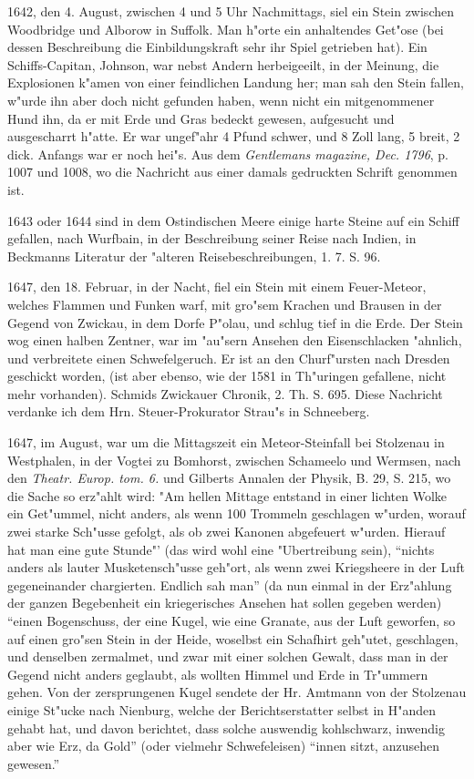\documentclass[a4paper, 11pt, oneside, polutonikogreek, german]{article}
\begin{document}
1642, den 4. August, zwischen 4 und 5 Uhr Nachmittags, siel ein Stein zwischen Woodbridge und Alborow in Suffolk. Man h"orte ein anhaltendes Get"ose (bei dessen Beschreibung die Einbildungskraft sehr ihr Spiel getrieben hat). Ein Schiffs-Capitan, Johnson, war nebst Andern herbeigeeilt, in der Meinung, die Explosionen k"amen von einer feindlichen Landung her; man sah den Stein fallen, w"urde ihn aber doch nicht gefunden haben, wenn nicht ein mitgenommener Hund ihn, da er mit Erde und Gras bedeckt gewesen, aufgesucht und ausgescharrt h"atte. Er war ungef"ahr 4 Pfund schwer, und 8 Zoll lang, 5 breit, 2 dick. Anfangs war er noch hei"s. Aus dem \emph{Gentlemans magazine, Dec. 1796}, p. 1007 und 1008, wo die Nachricht aus einer damals gedruckten Schrift genommen ist.

1643 oder 1644 sind in dem Ostindischen Meere einige harte Steine auf ein Schiff gefallen, nach Wurfbain, in der Beschreibung seiner Reise nach Indien, in Beckmanns Literatur der "alteren Reisebeschreibungen, 1. 7. S. 96.

1647, den 18. Februar, in der Nacht, fiel ein Stein mit einem Feuer-Meteor, welches Flammen und Funken warf, mit gro"sem Krachen und Brausen in der Gegend von Zwickau, in dem Dorfe P"olau, und schlug tief in die Erde. Der Stein wog einen halben Zentner, war im "au"sern Ansehen den Eisenschlacken "ahnlich, und verbreitete einen Schwefelgeruch. Er ist an den Churf"ursten nach Dresden geschickt worden, (ist aber ebenso, wie der 1581 in Th"uringen gefallene, nicht mehr vorhanden). Schmids Zwickauer Chronik, 2. Th. S. 695. Diese Nachricht verdanke ich dem Hrn. Steuer-Prokurator Strau"s in Schneeberg.

1647, im August, war um die Mittagszeit ein Meteor-Steinfall bei Stolzenau in Westphalen, in der Vogtei zu Bomhorst, zwischen Schameelo und Wermsen, nach den \emph{Theatr. Europ. tom. 6.} und Gilberts Annalen der Physik, B. 29, S. 215, wo die Sache so erz"ahlt wird: "Am hellen Mittage entstand in einer lichten Wolke ein Get"ummel, nicht anders, als wenn 100 Trommeln geschlagen w"urden, worauf zwei starke Sch"usse gefolgt, als ob zwei Kanonen abgefeuert w"urden. Hierauf hat man eine gute Stunde"' (das wird wohl eine "Ubertreibung sein), "`nichts anders als lauter Musketensch"usse geh"ort, als wenn zwei Kriegsheere in der Luft gegeneinander chargierten. Endlich sah man"' (da nun einmal in der Erz"ahlung der ganzen Begebenheit ein kriegerisches Ansehen hat sollen gegeben werden) "`einen Bogenschuss, der eine Kugel, wie eine Granate, aus der Luft geworfen, so auf einen gro"sen Stein in der Heide, woselbst ein Schafhirt geh"utet, geschlagen, und denselben zermalmet, und zwar mit einer solchen Gewalt, dass man in der Gegend nicht anders geglaubt, als wollten Himmel und Erde in Tr"ummern gehen. Von der zersprungenen Kugel sendete der Hr. Amtmann von der Stolzenau einige St"ucke nach Nienburg, welche der Berichtserstatter selbst in H"anden gehabt hat, und davon berichtet, dass solche auswendig kohlschwarz, inwendig aber wie Erz, da Gold"' (oder vielmehr Schwefeleisen) "`innen sitzt, anzusehen gewesen."'
\end{document}
